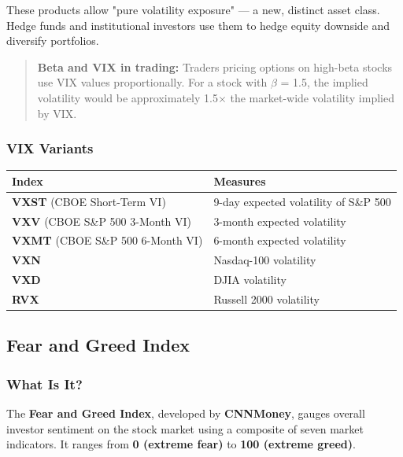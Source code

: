 \documentclass[12pt,openany]{book}
\begin{document}
These products allow "pure volatility exposure" — a new, distinct asset class. Hedge funds and institutional investors use them to hedge equity downside and diversify portfolios.

\begin{quote}
\textbf{Beta and VIX in trading:} Traders pricing options on high-beta stocks use VIX values proportionally. For a stock with \(\beta\) = 1.5, the implied volatility would be approximately 1.5\(\times\) the market-wide volatility implied by VIX.
\end{quote}

\subsubsection{VIX Variants}

\begin{center}
\scriptsize
\setlength{\tabcolsep}{3pt}
\begin{tabular}{|L{6.3cm}|L{6.3cm}|}
\hline
\textbf{Index} & \textbf{Measures} \\
\hline
\textbf{VXST} (CBOE Short-Term VI) & 9-day expected volatility of S\&P 500 \\
\hline
\textbf{VXV} (CBOE S\&P 500 3-Month VI) & 3-month expected volatility \\
\hline
\textbf{VXMT} (CBOE S\&P 500 6-Month VI) & 6-month expected volatility \\
\hline
\textbf{VXN} & Nasdaq-100 volatility \\
\hline
\textbf{VXD} & DJIA volatility \\
\hline
\textbf{RVX} & Russell 2000 volatility \\
\hline
\end{tabular}
\end{center}

\subsection{Fear and Greed Index}

\subsubsection{What Is It?}

The \textbf{Fear and Greed Index}, developed by \textbf{CNNMoney}, gauges overall investor sentiment on the stock market using a composite of seven market indicators. It ranges from \textbf{0 (extreme fear)} to \textbf{100 (extreme greed)}.
\end{document}
